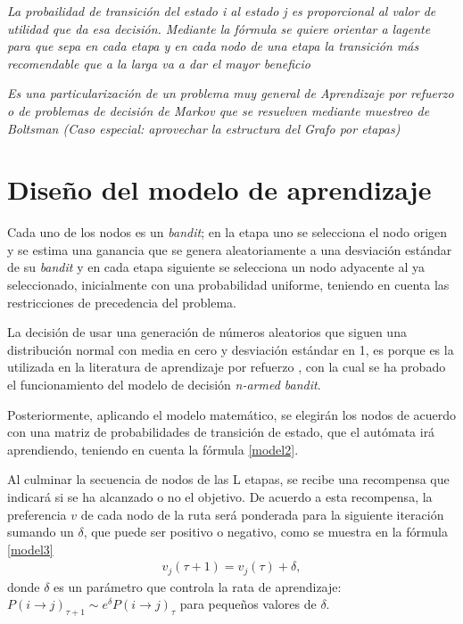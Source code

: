 \textit{La probailidad de transición del estado i al estado j es proporcional al valor de utilidad que da esa decisión. Mediante la fórmula se quiere orientar a lagente para que sepa en cada etapa y en cada nodo de una etapa la transición más recomendable que a la larga va a dar el mayor beneficio}

\textit{Es una particularización de un problema muy general de Aprendizaje por refuerzo o de problemas de decisión de Markov que se resuelven mediante muestreo de Boltsman (Caso especial: aprovechar la estructura del Grafo por etapas)}

\section{Diseño del modelo de aprendizaje} \label{aprende}
Cada uno de los nodos es un \textit{bandit}; en la etapa uno se selecciona el nodo origen y se estima una ganancia que se genera aleatoriamente a una desviación estándar de su \textit{bandit} y en cada etapa siguiente se selecciona un nodo adyacente al ya seleccionado, inicialmente con una probabilidad uniforme, teniendo en cuenta las restricciones de precedencia del problema. 

La decisión de usar una generación de números aleatorios que siguen una distribución normal con media en cero y desviación estándar en 1, es porque es la utilizada en la literatura de aprendizaje por refuerzo \citep{sutton1992reinforcement}, con la cual se ha probado el funcionamiento del modelo de decisión \textit{n-armed bandit}. 

Posteriormente, aplicando el modelo matemático, se elegirán los nodos de acuerdo con una matriz de probabilidades de transición de estado, que el autómata irá aprendiendo, teniendo en cuenta la fórmula \ref{model2}.

Al culminar la secuencia de nodos de las L etapas, se recibe una recompensa que indicará si se ha alcanzado o no el objetivo. De acuerdo a esta recompensa, la preferencia $v$ de cada nodo de la ruta será ponderada para la siguiente iteración sumando un $\delta$, que puede ser positivo o negativo, como se muestra en la fórmula \ref{model3}
\begin{eqnarray}\label{model3}
v_j(\tau + 1) = v_j(\tau) + \delta,
\end{eqnarray}
donde $\delta$ es un parámetro que controla la rata de aprendizaje: $P(i \to j)_{\tau+1} \sim e^{\delta} P(i \to j)_{\tau}$ para pequeños valores de $\delta$.



